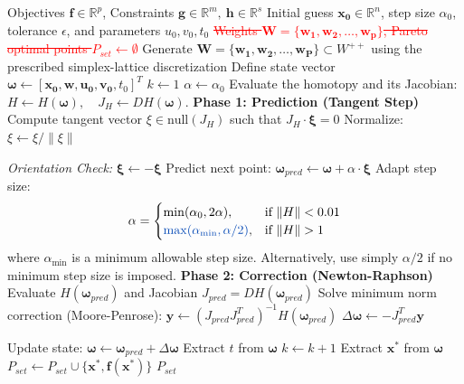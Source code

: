 \documentclass[11pt,pdflatex,sn-mathphys-ay]{sn-jnl}%
\theoremstyle{definition}
\theoremstyle{thmstyleone}%
\theoremstyle{thmstyletwo}%
\theoremstyle{thmstylethree}%
\newcommand{\R}{\mathbb{R}}
\newcommand{\norm}[1]{\left\lVert#1\right\rVert}
\newcommand{\omegaVec}{\boldsymbol{\omega}} %
\newcommand{\bb}[1]{\mathbf{#1}}
\newcounter{cases}
\newcommand{\del}[1]{\textcolor{red}{\sout{#1}}}
\newcommand{\add}[1]{\textcolor{revisionblue}{#1}}
\begin{document}
	\begin{algorithm}[htb]
		\caption{Homotopy Continuation Method (Predictor-Corrector)}
		\label{alg:homotopy}
		\begin{algorithmic}[1]
			\STATE Objectives $\bm{f} \in \R^p$, Constraints $\bm{g} \in \R^m,~ \bm{h} \in \R^s$
			\STATE Initial guess $\bm{x_0} \in \R^n$, step size $\alpha_0$, tolerance $\epsilon$, and parameters $u_0, v_0, t_0$
			\STATE \del{Weights $\bb{W} = \{\bb{w_1}, \bb{w_2}, \dots, \bb{w_p}\}$, Pareto optimal points $P_{set} \gets \emptyset$}
			\add{Generate $\bb{W} = \{\bb{w_1}, \bb{w_2}, \dots, \bb{w_P}\} \subset W^{++}$ using the prescribed simplex-lattice discretization}
			\FOR{\textbf{each} $\bb{w} \in \bb{W}$}
			\STATE Define state vector $\omegaVec \gets [\bm{x_0}, \bb{w}, \bm{u_0}, \bm{v_0}, t_0]^T$
			\STATE $k \gets 1$ 
			\add{\STATE $\alpha \gets \alpha_0$}
			\STATE Evaluate the homotopy and its Jacobian:
			$H \gets H(\omegaVec),\quad J_H \gets D H(\omegaVec).$
			\STATE \textbf{Phase 1: Prediction (Tangent Step)}
			\STATE Compute tangent vector $\xi \in \text{null}(J_H)$ such that $J_H \cdot \bm{\xi} = 0$
			\STATE Normalize: $\xi \gets \xi / \norm{\xi}$
			
			\STATE \textit{Orientation Check:}
			\STATE $\bm{\xi} \gets -\bm{\xi}$
			\ENDIF       
			\STATE Predict next point: $\omegaVec_{pred} \gets \omegaVec + \alpha \cdot \bm{\xi}$
			\STATE Adapt step size:
			\[
			\alpha =
			\begin{cases}
				\min(\alpha_0, 2\alpha), & \text{if } \|H\| < 0.01 \\
				\add{\max(\alpha_{\min}, \alpha/2)}, & \text{if } \|H\| > 1
			\end{cases}
			\]
			\add{where $\alpha_{\min}$ is a minimum allowable step size. Alternatively, use simply $\alpha/2$ if no minimum step size is imposed.}
			\STATE \textbf{Phase 2: Correction (Newton-Raphson)}
			\STATE Evaluate $H(\omegaVec_{pred})$ and Jacobian $J_{pred} = DH(\omegaVec_{pred})$       
			\STATE Solve minimum norm correction (Moore-Penrose):
			\STATE \quad $\bm{y} \gets (J_{pred} J_{pred}^T)^{-1} H(\omegaVec_{pred})$
			\STATE \quad $\Delta \omegaVec \gets -J_{pred}^T \bm{y}$
			
			\STATE Update state: $\omegaVec \gets \omegaVec_{pred} + \Delta \omegaVec$
			\STATE Extract $t$ from $\omegaVec$
			\STATE $k \gets k + 1$
			\ENDWHILE   
			\STATE Extract $ \bm{x}^*$ from $\omegaVec$
			\STATE $P_{set} \gets P_{set} \cup \{ \bm{x}^*, \bm{f}(\bm{x}^*)\}$
			\ENDIF
			\ENDFOR
			\STATE $P_{set}$
		\end{algorithmic}
	\end{algorithm}
	
\end{document}
